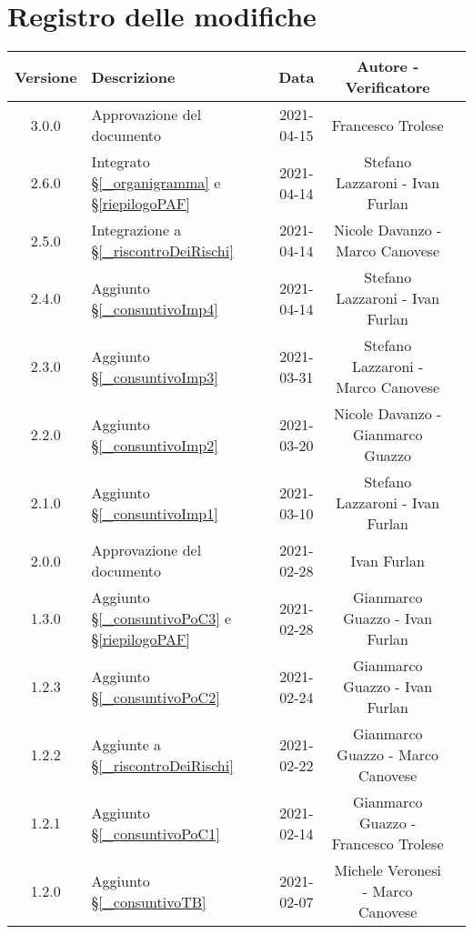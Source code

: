 \section*{Registro delle modifiche}

\begin{center}
	\begin{longtable}{|c|p{5cm}|c|c|c|}
		\hline
		\rowcolor{lighter-grayer}
		\textbf{Versione} & \textbf{Descrizione} & \textbf{Data} & \textbf{Autore - Verificatore} \\
		\hline
		\endfirsthead


		\hline
		3.0.0 & Approvazione del documento & 2021-04-15 & Francesco Trolese \\
		2.6.0 & Integrato \S\ref{_organigramma} e \S\ref{riepilogoPAF} & 2021-04-14 & Stefano Lazzaroni - Ivan Furlan\\
		2.5.0 & Integrazione a \S\ref{_riscontroDeiRischi} & 2021-04-14 & Nicole Davanzo - Marco Canovese \\
		2.4.0 & Aggiunto \S\ref{_consuntivoImp4} & 2021-04-14 & Stefano Lazzaroni - Ivan Furlan\\
		2.3.0 & Aggiunto \S\ref{_consuntivoImp3} & 2021-03-31 & Stefano Lazzaroni - Marco Canovese\\
		2.2.0 & Aggiunto \S\ref{_consuntivoImp2} & 2021-03-20 & Nicole Davanzo - Gianmarco Guazzo\\
		2.1.0 & Aggiunto \S\ref{_consuntivoImp1} & 2021-03-10 & Stefano Lazzaroni - Ivan Furlan \\
		2.0.0 & Approvazione del documento & 2021-02-28 & Ivan Furlan \\
		1.3.0 & Aggiunto \S\ref{_consuntivoPoC3} e \S\ref{riepilogoPAF} & 2021-02-28 & Gianmarco Guazzo - Ivan Furlan\\
		1.2.3 & Aggiunto \S\ref{_consuntivoPoC2} & 2021-02-24 & Gianmarco Guazzo - Ivan Furlan\\
		1.2.2 & Aggiunte a \S\ref{_riscontroDeiRischi} & 2021-02-22 & Gianmarco Guazzo - Marco Canovese \\
		1.2.1 & Aggiunto \S\ref{_consuntivoPoC1} & 2021-02-14 & Gianmarco Guazzo - Francesco Trolese\\
		1.2.0 & Aggiunto \S\ref{_consuntivoTB} & 2021-02-07 & Michele Veronesi - Marco Canovese\\

\end{longtable}
\end{center}
